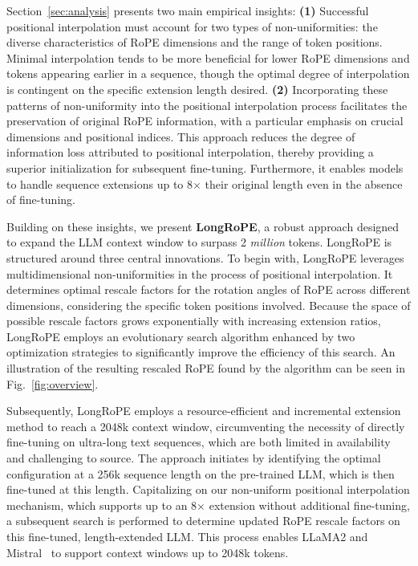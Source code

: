 Section~\ref{sec:analysis} presents two main empirical insights: \textbf{(1)} Successful positional interpolation must account for two types of non-uniformities: the diverse characteristics of RoPE dimensions and the range of token positions. Minimal interpolation tends to be more beneficial for lower RoPE dimensions and tokens appearing earlier in a sequence, though the optimal degree of interpolation is contingent on the specific extension length desired. 
\textbf{(2)} Incorporating these patterns of non-uniformity into the positional interpolation process facilitates the preservation of original RoPE information, with a particular emphasis on crucial dimensions and positional indices. This approach reduces the degree of information loss attributed to positional interpolation, thereby providing a superior initialization for subsequent fine-tuning. Furthermore, it enables models to handle sequence extensions up to 8$\times$ their original length even in the absence of fine-tuning.

Building on these insights, we present \textbf{LongRoPE}, a robust approach designed to expand the LLM context window to surpass 2 \emph{million} tokens. LongRoPE is structured around three central innovations. To begin with, {LongRoPE} leverages multidimensional non-uniformities in the process of positional interpolation. It determines optimal rescale factors for the rotation angles of RoPE across different dimensions, considering the specific token positions involved. Because the space of possible rescale factors grows exponentially with increasing extension ratios, {LongRoPE} employs an evolutionary search algorithm enhanced by two optimization strategies to significantly improve the efficiency of this search. An illustration of the resulting rescaled RoPE found by the algorithm can be seen in Fig.~\ref{fig:overview}.

Subsequently, {LongRoPE} employs a resource-efficient and incremental extension method to reach a 2048k context window, circumventing the necessity of directly fine-tuning on ultra-long text sequences, which are both limited in availability and challenging to source. The approach initiates by identifying the optimal configuration at a 256k sequence length on the pre-trained LLM, which is then fine-tuned at this length. Capitalizing on our non-uniform positional interpolation mechanism, which supports up to an 8$\times$ extension without additional fine-tuning, a subsequent search is performed to determine updated RoPE rescale factors on this fine-tuned, length-extended LLM. This process enables LLaMA2 and Mistral~\cite{mistral} to support context windows up to 2048k tokens.

